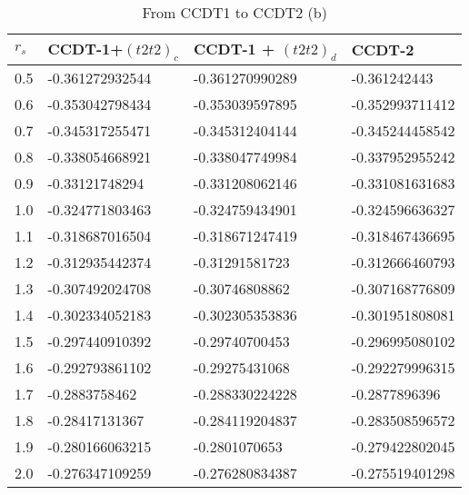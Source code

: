 \begin{table}[h]
\caption{From CCDT1 to CCDT2 (b)}
\begin{center}
\begin{threeparttable}
\begin{tabular}{l l l l}
    \toprule
$r_s$ & CCDT-1+$(t2t2)_c$ & CCDT-1 + $(t2t2)_d$ & CCDT-2  \\ \hline
0.5 & -0.361272932544 & -0.361270990289 & -0.361242443   \\
0.6 & -0.353042798434 & -0.353039597895 & -0.352993711412   \\
0.7 & -0.345317255471 & -0.345312404144 & -0.345244458542   \\
0.8 & -0.338054668921 & -0.338047749984 & -0.337952955242   \\
0.9 & -0.33121748294 & -0.331208062146 & -0.331081631683   \\
1.0 & -0.324771803463 & -0.324759434901 & -0.324596636327   \\
1.1 & -0.318687016504 & -0.318671247419 & -0.318467436695   \\
1.2 & -0.312935442374 & -0.31291581723 & -0.312666460793   \\
1.3 & -0.307492024708 & -0.30746808862 & -0.307168776809   \\
1.4 & -0.302334052183 & -0.302305353836 & -0.301951808081   \\
1.5 & -0.297440910392 & -0.29740700453 & -0.296995080102   \\
1.6 & -0.292793861102 & -0.29275431068 & -0.292279996315   \\
1.7 & -0.2883758462 & -0.288330224228 & -0.2877896396   \\
1.8 & -0.28417131367 & -0.284119204837 & -0.283508596572   \\
1.9 & -0.280166063215 & -0.2801070653 & -0.279422802045   \\
2.0 & -0.276347109259 & -0.276280834387 & -0.275519401298   \\
\bottomrule
\end{tabular}
\begin{tablenotes}
\end{tablenotes}
\end{threeparttable}
\end{center}
\label{tab:ccd1_to_ccdt2_2}
\end{table}

